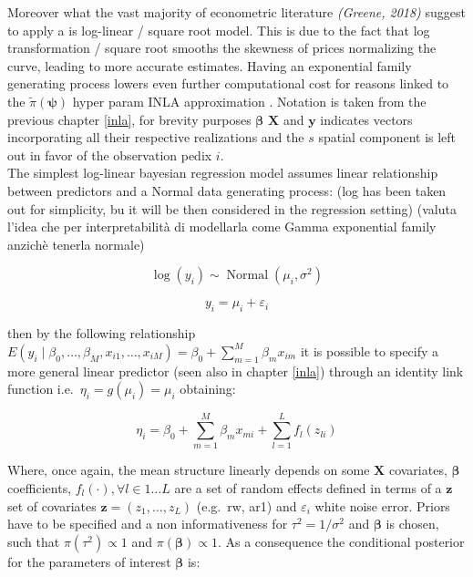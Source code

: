 \documentclass[
  12pt,
  a4paper,
  oneside]{book}
\theoremstyle{definition}
\theoremstyle{definition}
\theoremstyle{definition}
\theoremstyle{remark}
\begin{document}
Moreover what the vast majority of econometric literature \emph{(Greene, 2018)} suggest to apply a is log-linear / square root model. This is due to the fact that log transformation / square root smooths the skewness of prices normalizing the curve, leading to more accurate estimates. Having an exponential family generating process lowers even further computational cost for reasons linked to the \(\tilde\pi(\boldsymbol{\psi})\) hyper param INLA approximation \citep{Blangiardo-Cameletti}. Notation is taken from the previous chapter \ref{inla}, for brevity purposes \(\boldsymbol{\beta}\) \(\mathbf{X}\) and \(\boldsymbol{y}\) indicates vectors incorporating all their respective realizations and the \(s\) spatial component is left out in favor of the observation pedix \(i\).\\
The simplest log-linear bayesian regression model assumes linear relationship between predictors and a Normal data generating process: (log has been taken out for simplicity, bu it will be then considered in the regression setting) (valuta l'idea che per interpretabilità di modellarla come Gamma exponential family anzichè tenerla normale)

\[
\log{(y_{i})} \sim \operatorname{Normal}(\mu_{i}, \sigma^{2})
\]

\[
y_{i}=\mu_{i}+\varepsilon_{i}
\]

then by the following relationship \(E\left(y_{i} \mid \beta_{0}, \ldots, \beta_{M}, x_{i 1}, \ldots, x_{i M}\right)=\beta_{0}+\sum_{m=1}^{M} \beta_{m} x_{i m}\) it is possible to specify a more general linear predictor (seen also in chapter \ref{inla}) through an identity link function i.e.~\(\eta_{i}=g\left(\mu_{i}\right)=\mu_{i}\) obtaining:

\[
\eta_{i}=\beta_{0}+\sum_{m=1}^{M} \beta_{m} x_{m i}+\sum_{l=1}^{L} f_{l}\left(z_{l i}\right)
\]

Where, once again, the mean structure linearly depends on some \(\mathbf{X}\) covariates, \(\boldsymbol{\beta}\) coefficients, \(f_{l}(\cdot), \forall l \in 1 \ldots L\) are a set of random effects defined in terms of a \(\boldsymbol{z}\) set of covariates \(\boldsymbol{z}=\left(z_{1}, \ldots, z_{L}\right)\) (e.g.~rw, ar1) and \(\varepsilon_{i}\) white noise error.
Priors have to be specified and a non informativeness for \(\tau^2 = 1/\sigma^2\) and \(\boldsymbol{\beta}\) is chosen, such that \(\pi(\tau^2) \propto 1\) and \(\pi(\boldsymbol\beta) \propto 1\). As a consequence the conditional posterior for the parameters of interest \(\boldsymbol{\beta}\) is:
\end{document}
